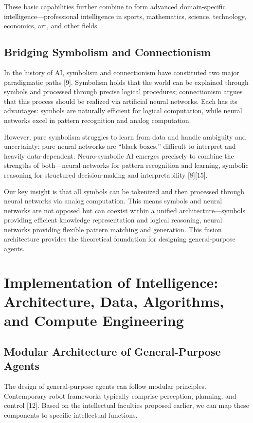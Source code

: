 \documentclass[12pt,a4paper]{article}
\begin{document}
These basic capabilities further combine to form advanced domain-specific intelligence—professional intelligence in sports, mathematics, science, technology, economics, art, and other fields.

\subsection{Bridging Symbolism and Connectionism}
In the history of AI, symbolism and connectionism have constituted two major paradigmatic paths [9]. Symbolism holds that the world can be explained through symbols and processed through precise logical procedures; connectionism argues that this process should be realized via artificial neural networks. Each has its advantages: symbols are naturally efficient for logical computation, while neural networks excel in pattern recognition and analog computation.

However, pure symbolism struggles to learn from data and handle ambiguity and uncertainty; pure neural networks are “black boxes,” difficult to interpret and heavily data-dependent. Neuro-symbolic AI emerges precisely to combine the strengths of both—neural networks for pattern recognition and learning, symbolic reasoning for structured decision-making and interpretability [8][15].

Our key insight is that all symbols can be tokenized and then processed through neural networks via analog computation. This means symbols and neural networks are not opposed but can coexist within a unified architecture—symbols providing efficient knowledge representation and logical reasoning, neural networks providing flexible pattern matching and generation. This fusion architecture provides the theoretical foundation for designing general-purpose agents.

\section{Implementation of Intelligence: Architecture, Data, Algorithms, and Compute Engineering}
\subsection{Modular Architecture of General-Purpose Agents}
The design of general-purpose agents can follow modular principles. Contemporary robot frameworks typically comprise perception, planning, and control [12]. Based on the intellectual faculties proposed earlier, we can map these components to specific intellectual functions.
\end{document}
